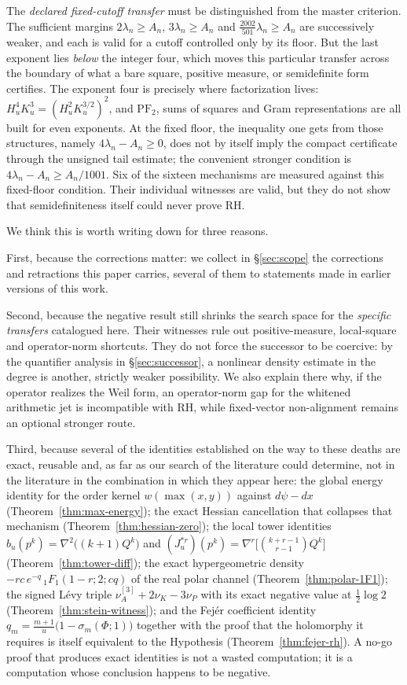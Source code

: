\documentclass[11pt]{amsart}
\theoremstyle{definition}
\theoremstyle{remark}
\theoremstyle{definition}
\begin{document}
The \emph{declared fixed-cutoff transfer} must be distinguished from the master criterion. The
sufficient margins $2\lambda_n\ge A_n$, $3\lambda_n\ge A_n$ and
$\tfrac{2002}{501}\lambda_n\ge A_n$ are successively weaker, and each is valid for a cutoff
controlled only by its floor. But the last exponent lies \emph{below} the integer four, which
moves this particular transfer across the boundary of what a bare square, positive measure, or
semidefinite form certifies.
The exponent four is precisely where factorization lives: $H_u^4K_u^3=(H_u^2K_u^{3/2})^2$, and
$\mathrm{PF}_2$, sums of squares and Gram representations are all built for even exponents.
At the fixed floor, the inequality one gets from those structures, namely
$4\lambda_n-A_n\ge0$, does not by itself imply the compact certificate through the unsigned tail
estimate; the convenient stronger condition is
$4\lambda_n-A_n\ge A_n/1001$. Six of the sixteen mechanisms are measured against this fixed-floor
condition. Their individual witnesses are valid, but they do not show that semidefiniteness
itself could never prove RH.

We think this is worth writing down for three reasons.

First, because the corrections matter: we collect in \S\ref{sec:scope} the corrections and
retractions this paper carries, several of them to statements made in earlier versions of this work.

Second, because the negative result still shrinks the search space for the \emph{specific
transfers} catalogued here.  Their witnesses rule out positive-measure, local-square and
operator-norm shortcuts.  They do not force the successor to be coercive: by the quantifier analysis
in \S\ref{sec:successor}, a nonlinear density estimate in the degree is another, strictly
weaker possibility.  We also explain there why, if the operator realizes the Weil form, an operator-norm gap
for the whitened arithmetic jet is incompatible with RH, while fixed-vector non-alignment remains an optional stronger route.

Third, because several of the identities established on the way to these deaths are exact,
reusable and, as far as our search of the literature could determine, not in the literature in the
combination in which they appear here: the global energy identity for the order kernel
$w(\max(x,y))$ against $d\psi-dx$ (Theorem~\ref{thm:max-energy}); the exact Hessian cancellation
that collapses that mechanism (Theorem~\ref{thm:hessian-zero}); the local tower identities
$b_u(p^k)=\nabla^2\bigl((k+1)Q^k\bigr)$ and
$(J_u^{*r})(p^k)=\nabla^r\bigl[\binom{k+r-1}{r-1}Q^k\bigr]$
(Theorem~\ref{thm:tower-diff}); the exact hypergeometric density
$-rc\,e^{-q}\,{}_1F_1(1-r;2;cq)$ of the real polar channel (Theorem~\ref{thm:polar-1F1}); the
signed L\'evy triple $\nu_A^{[3]}+2\nu_K-3\nu_P$ with its exact negative value at
$\tfrac12\log2$ (Theorem~\ref{thm:stein-witness}); and the Fej\'er coefficient identity
$q_m=\tfrac{m+1}{u}\bigl(1-\sigma_m(\Phi;1)\bigr)$ together with the proof that the holomorphy
it requires is itself equivalent to the Hypothesis (Theorem~\ref{thm:fejer-rh}). A no-go proof
that produces exact identities is not a wasted computation; it is a computation whose conclusion
happens to be negative.
\end{document}
